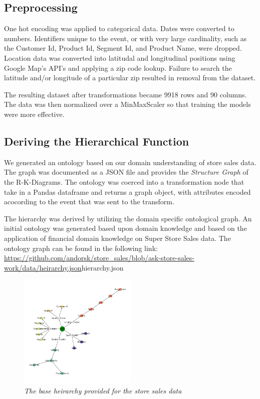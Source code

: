 \subsection{Preprocessing}

One hot encoding was applied to categorical data. Dates were converted to numbers. Identifiers unique to the event, or with very large cardinality, such as the Customer Id, Product Id, Segment Id, and Product Name, were dropped. Location data was converted into latitudal and longitudinal positions using Google Map's API's and applying a zip code lookup. Failure to search the latitude and/or longitude of a particular zip resulted in removal from the dataset.

The resulting dataset after transformations became 9918 rows and 90 columns. The data was then normalized over a MinMaxScaler so that training the models were more effective.

\subsection{Deriving the Hierarchical Function}

We generated an ontology based on our domain understanding of store sales data. The graph was documented as a JSON file and provides the \textit{Structure Graph} of the R-K-Diagrams. The ontology was coerced into a transformation node that take in a Pandas dataframe and returns a graph object, with attributes encoded acocording to the event that was sent to the transform.

The hierarchy was derived by utilizing the domain specific ontological graph. An initial ontology was generated based upon domain knowledge and based on the application of financial domain knowledge on Super Store Sales data. The ontology graph can be found in the following link: \url{https://github.com/andorsk/store_sales/blob/ask-store-sales-work/data/heirarchy.json}{hierarchy.json}

\begin{figure}[H]
	\centering
        \includegraphics[width=0.5\textwidth]{images/base_hierarchy.png}
	\caption{\textit{The base heirarchy provided for the store sales data}}
	\label{fig:nodemask}
\end{figure}

